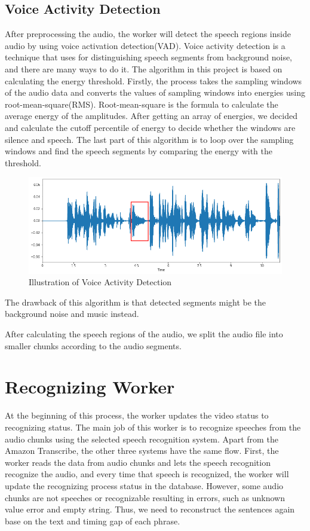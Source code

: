 \documentclass[natbib]{muthesis}
\begin{document}
 \subsection{Voice Activity Detection}
 After preprocessing the audio, the worker will detect the speech regions inside audio by using voice activation detection(VAD). Voice activity detection is a technique that uses for distinguishing speech segments from background noise, and there are many ways to do it. The algorithm in this project is based on calculating the energy threshold. Firstly, the process takes the sampling windows of the audio data and converts the values of sampling windows into energies using root-mean-square(RMS). Root-mean-square is the formula to calculate the average energy of the amplitudes. After getting an array of energies, we decided and calculate the cutoff percentile of energy to decide whether the windows are silence and speech. The last part of this algorithm is to loop over the sampling windows and find the speech segments by comparing the energy with the threshold.\cite{VADEnergybase}
 \begin{figure}[H]
 	\centering
 	\captionsetup{justification=centering}
 	\includegraphics[width=0.9\linewidth]{images/vad}
 	\caption{Illustration of Voice Activity Detection}
 	\label{fig:vad}
 \end{figure}
 
 
 The drawback of this algorithm is that detected segments might be the background noise and music instead.
 
 After calculating the speech regions of the audio, we split the audio file into smaller chunks according to the audio segments.
 
 \section{Recognizing Worker}
 At the beginning of this process, the worker updates the video status to recognizing status. The main job of this worker is to recognize speeches from the audio chunks using the selected speech recognition system. Apart from the Amazon Transcribe, the other three systems have the same flow. First, the worker reads the data from audio chunks and lets the speech recognition recognize the audio, and every time that speech is recognized, the worker will update the recognizing process status in the database. However, some audio chunks are not speeches or recognizable resulting in errors, such as unknown value error and empty string. Thus, we need to reconstruct the sentences again base on the text and timing gap of each phrase.
 
\end{document}
